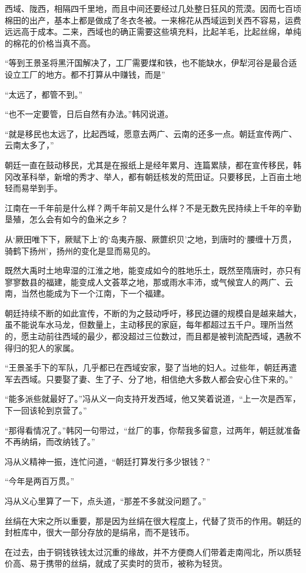 西域、陇西，相隔四千里地，而且中间还要经过几处整日狂风的荒漠。因而七百顷棉田的出产，基本上都是做成了冬衣冬被。一来棉花从西域运到关西不容易，运费远远高于成本。二来，西域也的确正需要这些填充料，比起羊毛，比起丝绵，单纯的棉花的价格当真不高。

“等到王景圣将黑汗国解决了，工厂需要煤和铁，也不能缺水，伊犁河谷是最合适设立工厂的地方。都不打算从中赚钱，而是”

“太远了，都管不到。”

“也不一定要管，日后自然有办法。”韩冈说道。

“就是移民也太远了，比起西域，愿意去两广、云南的还多一点。朝廷宣传两广、云南太多了，”

朝廷一直在鼓动移民，尤其是在报纸上是经年累月、连篇累牍，都在宣传移民，韩冈改革科举，新增的秀才、举人，都有朝廷核发的荒田证。只要移民，上百亩土地轻而易举到手。

江南在一千年前是什么样？两千年前又是什么样？不是无数先民持续上千年的辛勤垦殖，怎么会有如今的鱼米之乡？

从‘厥田唯下下，厥赋下上’的‘岛夷卉服、厥篚织贝’之地，到唐时的‘腰缠十万贯，骑鹤下扬州’，扬州的变化是显而易见的。

既然大禹时土地卑湿的江淮之地，能变成如今的胜地乐土，既然至隋唐时，亦只有寥寥数县的福建，能变成人文荟萃之地，那或雨水丰沛，或气候宜人的两广、云南，当然也能成为下一个江南，下一个福建。

朝廷持续不断的如此宣传，不断的为之鼓动呼吁，移民边疆的规模自是越来越大，虽不能说车水马龙，但数量上，主动移民的家庭，每年都超过五千户。理所当然的，愿主动前往西域的最少，都没超过三位数过，而且都是被判流配西域，遇赦不得归的犯人的家属。

“王景圣手下的军队，几乎都已在西域安家，娶了当地的妇人。过些年，朝廷再遣军去西域。只要娶了妻、生了子、分了地，相信绝大多数人都会安心住下来的。”

“能多派些就最好了。”冯从义一向支持开发西域，他又笑着说道，“上一次是西军，下一回该轮到京营了。”

“那得看情况了。”韩冈一句带过，“丝厂的事，你帮我多留意，过两年，朝廷就准备不再纳绢，而改纳钱了。”

冯从义精神一振，连忙问道，“朝廷打算发行多少银钱？”

“今年是两百万贯。”

冯从义心里算了一下，点头道，“那差不多就没问题了。”

丝绢在大宋之所以重要，那是因为丝绢在很大程度上，代替了货币的作用。朝廷的封桩库中，很大一部分存放的是绢帛，而不是钱币。

在过去，由于铜钱铁钱太过沉重的缘故，并不方便商人们带着走南闯北，所以质轻价高、易于携带的丝绢，就成了买卖时的货币，被称为轻货。

